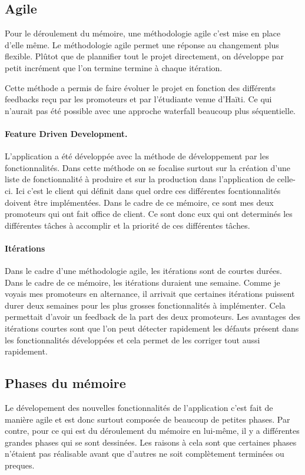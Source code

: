 \documentclass{EPL-master-thesis-covers-FR}
\begin{document}
			\subsection*{Agile}
				Pour le déroulement du mémoire, une méthodologie agile c'est mise en place d'elle même.
				Le méthodologie agile permet une réponse au changement plus flexible. Plûtot que de plannifier tout le projet directement, on développe par petit incrément que l'on termine termine à chaque itération. 
				
				Cette méthode a permis de faire évoluer le projet en fonction des différents feedbacks reçu par les promoteurs et par l'étudiante venue d'Haïti. Ce qui n'aurait pas été possible avec une approche waterfall beaucoup plus séquentielle.
				
			
				\paragraph*{Feature Driven Development.} L'application a été développée avec la méthode de développement par les fonctionnalités. Dans cette méthode on se focalise surtout sur la création d'une liste de fonctionnalité à produire et sur la production dans l'application de celle-ci. Ici c'est le client qui définit dans quel ordre ces différentes focntionnalités doivent être implémentées. Dans le cadre de ce mémoire, ce sont mes deux promoteurs qui ont fait office de client. Ce sont donc eux qui ont determinés les différentes tâches à accomplir et la priorité de ces différentes tâches. 
				
				\paragraph*{Itérations} Dans le cadre d'une méthodologie agile, les itérations sont de courtes durées. Dans le cadre de ce mémoire, les itérations duraient une semaine. Comme je voyais mes promoteurs en alternance, il arrivait que certaines itérations puissent durer deux semaines pour les plus grosses fonctionnalités à implémenter. Cela permettait d'avoir un feedback de la part des deux promoteurs.
				Les avantages des itérations courtes sont que l'on peut détecter rapidement les défauts présent dans les fonctionnalités développées et cela permet de les corriger tout aussi rapidement. 

				

			\subsection*{Phases du mémoire}
				Le dévelopement des nouvelles fonctionnalités de l'application c'est fait de manière agile et est donc surtout composée de beaucoup de petites phases. Par contre, pour ce qui est du déroulement du mémoire en lui-même, il y a différentes grandes phases qui se sont dessinées.
			Les raisons à cela sont que certaines phases n'étaient pas réalisable avant que d'autres ne soit complètement terminées ou preques. 
			
\end{document}
